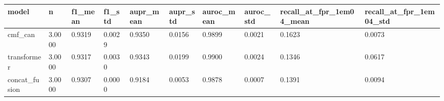 \begin{tabular}{llllllllll}
\toprule
model & n & f1\_mean & f1\_std & aupr\_mean & aupr\_std & auroc\_mean & auroc\_std & recall\_at\_fpr\_1em04\_mean & recall\_at\_fpr\_1em04\_std \\
\midrule
cmf\_can & 3.0000 & 0.9319 & 0.0029 & 0.9350 & 0.0156 & 0.9899 & 0.0021 & 0.1623 & 0.0073 \\
transformer & 3.0000 & 0.9317 & 0.0030 & 0.9343 & 0.0199 & 0.9900 & 0.0024 & 0.1346 & 0.0617 \\
concat\_fusion & 3.0000 & 0.9307 & 0.0000 & 0.9184 & 0.0053 & 0.9878 & 0.0007 & 0.1391 & 0.0094 \\
\bottomrule
\end{tabular}
